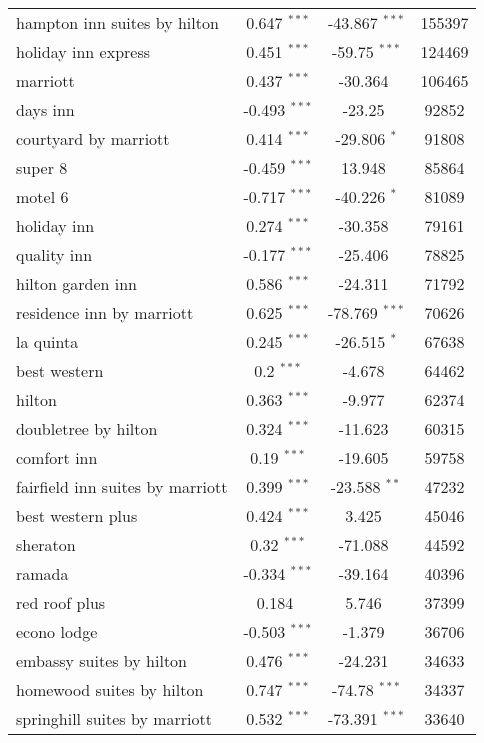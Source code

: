 \begin{table}[!htbp]
{\begin{tabular}{@{\extracolsep{5pt}}lccc}
hampton inn suites by hilton	&	0.647	$	^	{***} 	$	&	-43.867	$	^	{***} 	$	&	155397	\\
holiday inn express	&	0.451	$	^	{***} 	$	&	-59.75	$	^	{***} 	$	&	124469	\\
marriott	&	0.437	$	^	{***} 	$	&	-30.364	$			$	&	106465	\\
days inn	&	-0.493	$	^	{***} 	$	&	-23.25	$			$	&	92852	\\
courtyard by marriott	&	0.414	$	^	{***} 	$	&	-29.806	$	^	{*} 	$	&	91808	\\
super 8	&	-0.459	$	^	{***} 	$	&	13.948	$	 		$	&	85864	\\
motel 6	&	-0.717	$	^	{***} 	$	&	-40.226	$	^	{*} 	$	&	81089	\\
holiday inn	&	0.274	$	^	{***} 	$	&	-30.358	$			$	&	79161	\\
quality inn	&	-0.177	$	^	{***} 	$	&	-25.406	$			$	&	78825	\\
hilton garden inn	&	0.586	$	^	{***} 	$	&	-24.311	$			$	&	71792	\\
residence inn by marriott	&	0.625	$	^	{***} 	$	&	-78.769	$	^	{***} 	$	&	70626	\\
la quinta	&	0.245	$	^	{***} 	$	&	-26.515	$	^	{*} 	$	&	67638	\\
best western	&	0.2	$	^	{***} 	$	&	-4.678	$			$	&	64462	\\
hilton	&	0.363	$	^	{***} 	$	&	-9.977	$			$	&	62374	\\
doubletree by hilton	&	0.324	$	^	{***} 	$	&	-11.623	$			$	&	60315	\\
comfort inn	&	0.19	$	^	{***} 	$	&	-19.605	$			$	&	59758	\\
fairfield inn suites by marriott	&	0.399	$	^	{***} 	$	&	-23.588	$	^	{**} 	$	&	47232	\\
best western plus	&	0.424	$	^	{***} 	$	&	3.425	$			$	&	45046	\\
sheraton	&	0.32	$	^	{***} 	$	&	-71.088	$			$	&	44592	\\
ramada	&	-0.334	$	^	{***} 	$	&	-39.164	$			$	&	40396	\\
red roof plus	&	0.184	$	 		$	&	5.746	$			$	&	37399	\\
econo lodge	&	-0.503	$	^	{***} 	$	&	-1.379	$			$	&	36706	\\
embassy suites by hilton	&	0.476	$	^	{***} 	$	&	-24.231	$			$	&	34633	\\
homewood suites by hilton	&	0.747	$	^	{***} 	$	&	-74.78	$	^	{***} 	$	&	34337	\\
springhill suites by marriott	&	0.532	$	^	{***} 	$	&	-73.391	$	^	{***} 	$	&	33640	\\

\end{tabular}}
\end{table}
